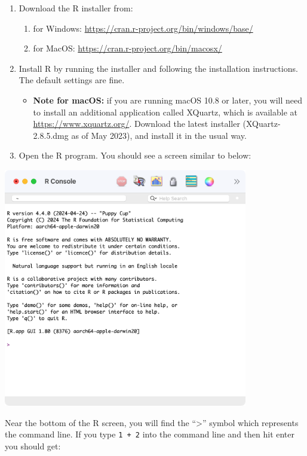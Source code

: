 \documentclass[
  a4paper,
]{memoir}
\providecommand{\tightlist}{%
  \setlength{\itemsep}{0pt}\setlength{\parskip}{0pt}}\usepackage{longtable,booktabs,array}
\begin{document}
\begin{enumerate}
\def\labelenumi{\arabic{enumi}.}
\item
  Download the R installer from:

  \begin{enumerate}
  \def\labelenumii{\alph{enumii}.}
  \tightlist
  \item
    for Windows: \url{https://cran.r-project.org/bin/windows/base/}
  \item
    for MacOS: \url{https://cran.r-project.org/bin/macosx/}
  \end{enumerate}
\item
  Install R by running the installer and following the installation
  instructions. The default settings are fine.

  \begin{itemize}
  \tightlist
  \item
    \textbf{Note for macOS:} if you are running macOS 10.8 or later, you
    will need to install an additional application called XQuartz, which
    is available at \url{https://www.xquartz.org/}. Download the latest
    installer (XQuartz-2.8.5.dmg as of May 2023), and install it in the
    usual way.
  \end{itemize}
\item
  Open the R program. You should see a screen similar to below:
\end{enumerate}

\includegraphics[width=0.8\textwidth,height=\textheight]{img/mod01/R-screenshot.png}

Near the bottom of the R screen, you will find the ``\textgreater{}''
symbol which represents the command line. If you type \texttt{1\ +\ 2}
into the command line and then hit enter you should get:
\end{document}
